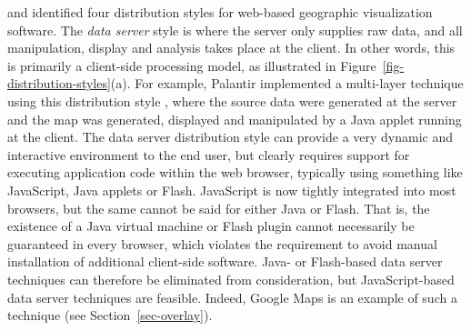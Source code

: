 \documentclass[acmnow]{acmtrans2m}
\begin{document}
 and  identified four
distribution styles for web-based geographic visualization software. The
\emph{data server} style is where the server only supplies raw data, and
all manipulation, display and analysis takes place at the client. In
other words, this is primarily a client-side processing model, as
illustrated in Figure~\ref{fig-distribution-styles}(a). For example,
Palantir implemented a multi-layer technique using this distribution
style \cite{Papa-N-1998-Palantir}, where the source data were generated
at the server and the map was generated, displayed and manipulated by a
Java applet running at the client. The data server distribution style
can provide a very dynamic and interactive environment to the end user,
but clearly requires support for executing application code within the
web browser, typically using something like JavaScript, Java applets or
Flash. JavaScript is now tightly integrated into most browsers, but the
same cannot be said for either Java or Flash. That is, the existence of
a Java virtual machine or Flash plugin cannot necessarily be guaranteed
in every browser, which violates the requirement to avoid manual
installation of additional client-side software. Java- or Flash-based
data server techniques can therefore be eliminated from consideration,
but JavaScript-based data server techniques are feasible. Indeed, Google
Maps is an example of such a technique (see Section~\ref{sec-overlay}).
\end{document}

